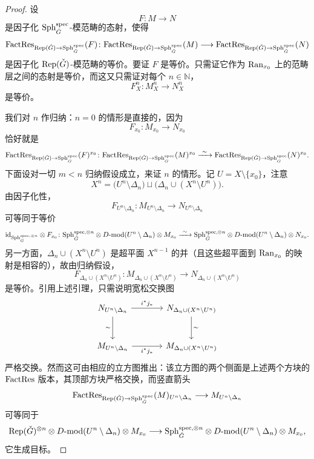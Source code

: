 \begin{proof}
设
\[
F\colon M\longrightarrow N
\]
是因子化 $\mathrm{Sph}^{\mathrm{spec}}_{\check G}$-模范畴的态射，使得
\[
\mathrm{FactRes}_{\mathrm{Rep}(\check G)\to \mathrm{Sph}^{\mathrm{spec}}_{\check G}}(F)\colon
\mathrm{FactRes}_{\mathrm{Rep}(\check G)\to \mathrm{Sph}^{\mathrm{spec}}_{\check G}}(M)\longrightarrow
\mathrm{FactRes}_{\mathrm{Rep}(\check G)\to \mathrm{Sph}^{\mathrm{spec}}_{\check G}}(N)
\]
是因子化 $\mathrm{Rep}(\check G)$-模范畴的等价。要证 $F$ 是等价。只需证它作为
$\mathrm{Ran}_{x_0}$ 上的范畴层之间的态射是等价，而这又只需证对每个 $n\in \mathbb{N}$，
\[
F^n_X\colon M^n_X\longrightarrow N^n_X
\]
是等价。

我们对 $n$ 作归纳：$n=0$ 的情形是直接的，因为
\[
F_{x_0}\colon M_{x_0}\longrightarrow N_{x_0}
\]
恰好就是
\[
\mathrm{FactRes}_{\mathrm{Rep}(\check G)\to \mathrm{Sph}^{\mathrm{spec}}_{\check G}}(F)^{x_0}\colon
\mathrm{FactRes}_{\mathrm{Rep}(\check G)\to \mathrm{Sph}^{\mathrm{spec}}_{\check G}}(M)^{x_0}
\xrightarrow{\ \sim\ }
\mathrm{FactRes}_{\mathrm{Rep}(\check G)\to \mathrm{Sph}^{\mathrm{spec}}_{\check G}}(N)^{x_0}.
\]
下面设对一切 $m<n$ 归纳假设成立，来证 $n$ 的情形。记
$U=X\setminus\{x_0\}$，注意
\[
X^n=\bigl(U^n\setminus \Delta_n\bigr)\sqcup
\bigl(\Delta_n\cup (X^n\setminus U^n)\bigr).
\]
由因子化性，
\[
F_{U^n\setminus\Delta_n}\colon
M_{U^n\setminus\Delta_n}\longrightarrow N_{U^n\setminus\Delta_n}
\]
可等同于等价
\[
\mathrm{id}_{\mathrm{Sph}^{\mathrm{spec},\otimes n}_{\check G}}\otimes F_{x_0}\colon
\mathrm{Sph}^{\mathrm{spec},\otimes n}_{\check G}\otimes D\text{-}\mathrm{mod}(U^n\setminus\Delta_n)
\otimes M_{x_0}
\xrightarrow{\ \sim\ }
\mathrm{Sph}^{\mathrm{spec},\otimes n}_{\check G}\otimes
D\text{-}\mathrm{mod}(U^n\setminus\Delta_n)\otimes N_{x_0}.
\]
另一方面，$\Delta_n\cup (X^n\setminus U^n)$ 是超平面 $X^{n-1}$ 的并（且这些超平面到
$\mathrm{Ran}_{x_0}$ 的映射是相容的），故由归纳假设，
\[
F_{\Delta_n\cup(X^n\setminus U^n)}\colon
M_{\Delta_n\cup(X^n\setminus U^n)}\longrightarrow
N_{\Delta_n\cup(X^n\setminus U^n)}
\]
是等价。引用上述引理，只需说明宽松交换图
\[
\begin{tikzcd}[column sep=large,row sep=large]
N_{U^n\setminus\Delta_n}
\arrow[r,"i^{*}j_{*}"]
\arrow[d,"\sim"'] &
N_{\Delta_n\cup(X^n\setminus U^n)}
\arrow[d,"\sim"]\\
M_{U^n\setminus\Delta_n}
\arrow[r,"i^{*}j_{*}"'] &
M_{\Delta_n\cup(X^n\setminus U^n)}
\end{tikzcd}
\]
严格交换。然而这可由相应的立方图推出：该立方图的两个侧面是上述两个方块的
$\mathrm{FactRes}$ 版本，其顶部方块严格交换，而竖直箭头
\[
\mathrm{FactRes}_{\mathrm{Rep}(\check G)\to \mathrm{Sph}^{\mathrm{spec}}_{\check G}}(M)
_{U^n\setminus\Delta_n}\longrightarrow M_{U^n\setminus\Delta_n}
\]
可等同于
\[
\mathrm{Rep}(\check G)^{\otimes n}\otimes D\text{-}\mathrm{mod}(U^n\setminus\Delta_n)
\otimes M_{x_0}\longrightarrow
\mathrm{Sph}^{\mathrm{spec},\otimes n}_{\check G}\otimes D\text{-}\mathrm{mod}(U^n\setminus\Delta_n)
\otimes M_{x_0},
\]
它生成目标。
\end{proof}

